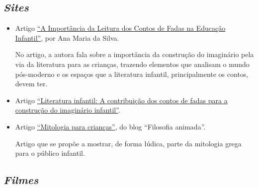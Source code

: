 \documentclass[11pt]{extarticle}
\begin{document}
\subsection{\textit{Sites}}

\begin{itemize}
\item Artigo \href{https://siteantigo.portaleducacao.com.br/conteudo/artigos/educacao/a-importancia-da-leitura-dos-contos-de-fadas-na-educacao-infantil/30151}{``A Importância da Leitura dos Contos de Fadas na Educação Infantil''}, por Ana Maria da Silva.  

No artigo, a autora fala sobre a importância da construção do imaginário pela via da literatura para as crianças, trazendo elementos que analisam o mundo pós-moderno e os espaços que a literatura infantil, principalmente os contos, devem ter.

\item Artigo \href{http://docs.uninove.br/arte/fac/publicacoes/pdf/v3-n1-2012/Francy.pdf}{``Literatura infantil: A contribuição dos contos de fadas para a construção do imaginário infantil''}.

\item Artigo \href{https://danielmcarlos.wordpress.com/2014/02/09/mitologia-para-criancas/}{``Mitologia para crianças''}, do blog ``Filosofia animada''. 

Artigo que se propõe a mostrar, de forma lúdica, parte da mitologia grega para o público infantil.

\end{itemize}

\subsection{\textit{Filmes}}
\end{document}
